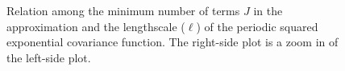 \documentclass[onecolumn,a4paper,11pt]{article}
\begin{document}
\begin{figure}
\centering
{}
\hspace{3mm}
\caption{Relation among the minimum number of terms $J$ in the approximation and the lengthscale ($\ell$) of the periodic squared exponential covariance function. The right-side plot is a zoom in of the left-side plot.}
  \label{ch5_fig28_m_lscale_periodic}
\end{figure}
\end{document}
